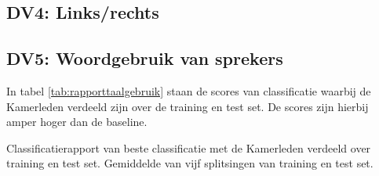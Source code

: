 \subsection{DV4: Links/rechts}

\subsection{DV5: Woordgebruik van sprekers}
In tabel \ref{tab:rapporttaalgebruik} staan de scores van classificatie waarbij de Kamerleden verdeeld zijn over de training en test set. De scores zijn hierbij amper hoger dan de baseline.
\begin{table}[H]
\caption{Classificatierapport van beste classificatie met de Kamerleden verdeeld over training en test set. Gemiddelde van vijf splitsingen van training en test set.}
\label{tab:rapporttaalgebruik}
\centering

\end{table}


